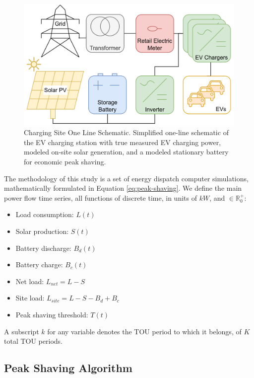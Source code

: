 \documentclass[conference]{IEEEtran}
\begin{document}
\begin{figure}
  \centering
  \includegraphics[width=1\linewidth]{images/oneline.png}
  \caption{Charging Site One Line Schematic. Simplified one-line schematic of the EV charging station with true measured EV charging power, modeled on-site solar generation, and a modeled stationary battery for economic peak shaving.}
  \label{fig:one-line}
\end{figure}

The methodology of this study is a set of energy dispatch computer simulations, mathematically formulated in Equation \ref{eq:peak-shaving}. We define the main power flow time series, all functions of discrete time, in units of $kW$, and $\in \mathbb{R}_0^+$:

\begin{itemize}
\item Load consumption: $ L(t) $%
\item Solar production: $ S(t) $ %
\item Battery discharge: $ B_d(t) $ %
\item Battery charge: $ B_c(t) $ %
\item Net load: $ L_{net} = L - S$
\item Site load: $ L_{site} = L - S - B_d + B_c$
\item Peak shaving threshold: $ T(t) $ %
\end{itemize}

A subscript $k$ for any variable denotes the TOU period to which it belongs, of $K$ total TOU periods. 

\subsection{Peak Shaving Algorithm}
\end{document}
